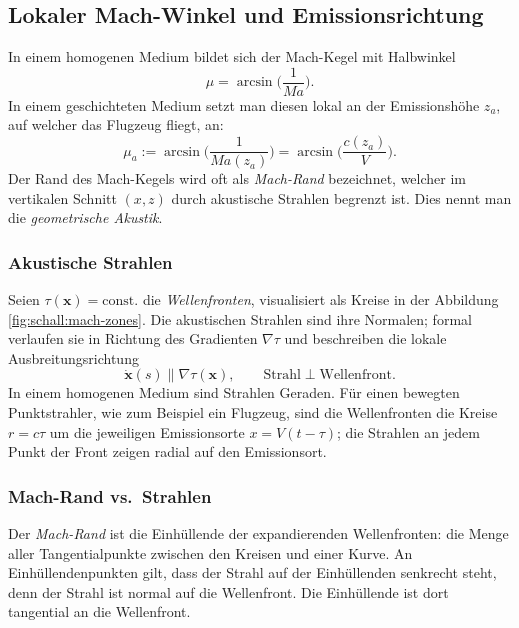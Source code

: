 \subsection{Lokaler Mach-Winkel und Emissionsrichtung}
\label{schall:lok-mach-emission}
In einem homogenen Medium bildet sich der Mach-Kegel mit Halbwinkel
\begin{equation*}
    \mu = \arcsin\biggl(\frac{1}{\textit{Ma}}\biggr).
\end{equation*}
In einem geschichteten Medium setzt man diesen lokal an der
Emissionshöhe $z_a$, auf welcher das Flugzeug fliegt, an:
\begin{equation}
    \mu_a := \arcsin\biggl(\frac{1}{\textit{Ma}(z_a)}\biggr)
    = \arcsin\biggl(\frac{c(z_a)}{V}\biggr) .
    \label{eq:local-mach-angle}
\end{equation}
Der Rand des Mach-Kegels wird oft als \emph{Mach-Rand} bezeichnet, welcher im
vertikalen Schnitt $(x,z)$ durch akustische Strahlen begrenzt ist.
Dies nennt man die \emph{geometrische Akustik}.

\subsubsection{Akustische Strahlen}
Seien $\tau(\boldsymbol{x})=\mathrm{const.}$ die \emph{Wellenfronten}, visualisiert
als Kreise in der Abbildung \ref{fig:schall:mach-zones}.
Die akustischen Strahlen sind ihre Normalen; formal verlaufen sie
in Richtung des Gradienten $\nabla\tau$ und beschreiben die lokale
Ausbreitungsrichtung
\[
    \dot{\boldsymbol{x}}(s) \parallel \nabla\tau(\boldsymbol{x}),\qquad
    \text{Strahl} \perp \text{Wellenfront}.
\]
In einem homogenen Medium sind Strahlen Geraden.
Für einen bewegten Punktstrahler, wie zum Beispiel ein Flugzeug,
sind die Wellenfronten die Kreise $r=c\tau$ um die jeweiligen Emissionsorte
$x=V(t-\tau)$; die Strahlen an jedem Punkt der Front zeigen radial auf den Emissionsort.

\subsubsection{Mach-Rand vs.~Strahlen}
Der \emph{Mach-Rand} ist die Einhüllende der expandierenden Wellenfronten:
%
die Menge aller Tangentialpunkte zwischen den Kreisen und einer Kurve.
An Einhüllendenpunkten gilt, dass der Strahl auf der Einhüllenden senkrecht
steht,
denn der Strahl ist normal auf die Wellenfront.
Die Einhüllende ist dort tangential an die Wellenfront.


